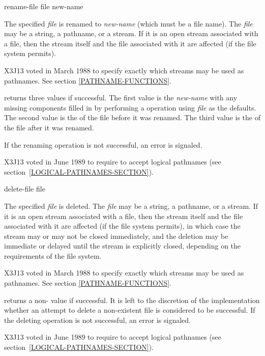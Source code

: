 \begin{defun}[Function]
rename-file file new-name

The specified \emph{file} is renamed to \emph{new-name} (which must be a file name).
The \emph{file} may be a string, a pathname, or a stream.  If it is an open stream
associated with a file, then the stream itself and the file associated
with it are affected (if the file system permits).

\begin{new}
X3J13 voted in March 1988
to specify exactly which streams may be used as pathnames.
See section \ref{PATHNAME-FUNCTIONS}.
\end{new}

 returns three values if successful.  The first value
is the \emph{new-name} with any missing components filled in by performing
a  operation using \emph{file} as the defaults.
The second value is the  of the file before it was renamed.
The third value is the  of the file after it was renamed.

If the renaming operation is not successful, an error is signaled.

\begin{newer}
X3J13 voted in June 1989  to require 
to accept logical pathnames (see section~\ref{LOGICAL-PATHNAMES-SECTION}).
\end{newer}
\end{defun}

\begin{defun}[Function]
delete-file file

The specified \emph{file} is deleted.  The \emph{file} may be a string, a
pathname, or a stream.  If it is an open stream associated with a file,
then the stream itself and the file associated with it are affected (if
the file system permits), in which case the stream may or may not be
closed immediately, and the deletion may be immediate or delayed until
the stream is explicitly closed, depending on the requirements of the
file system.

\begin{new}
X3J13 voted in March 1988
to specify exactly which streams may be used as pathnames.
See section \ref{PATHNAME-FUNCTIONS}.
\end{new}

 returns a non-{\nil} value if successful.
It is left to the discretion of the implementation whether an attempt
to delete a non-existent file is considered to be successful.
If the deleting operation is not successful, an error is signaled.

\begin{newer}
X3J13 voted in June 1989  to require 
to accept logical pathnames (see section~\ref{LOGICAL-PATHNAMES-SECTION}).
\end{newer}
\end{defun}

